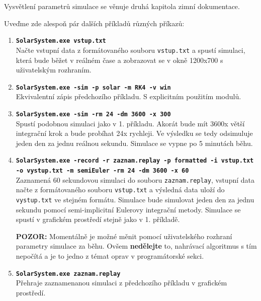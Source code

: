 Vysvětlení parametrů simulace se věnuje druhá kapitola zimní dokumentace.

Uveďme zde alespoň pár dalších příkladů různých příkazů:
\begin{enumerate}
	\item \texttt{\textbf{SolarSystem.exe vstup.txt}} \\
	Načte vstupní data z formátovaného souboru \texttt{vstup.txt} a spustí simulaci, která bude běžet v reálném čase a zobrazovat se v okně 1200x700 s uživatelským rozhraním.
	\item \texttt{\textbf{SolarSystem.exe -sim -p solar -m RK4 -v win}} \\
	 Ekvivalentní zápis předchozího příkladu. S explicitním použitím modulů.
	\item \texttt{\textbf{SolarSystem.exe -sim -rm 24 -dm 3600 -x 300}} \\
	Spustí podobnou simulaci jako v 1. příkladu. Akorát bude mít 3600x větší integrační krok a bude probíhat 24x rychleji. Ve výsledku se tedy odsimuluje jeden den za jednu reálnou sekundu. Simulace se vypne po 5 minutách běhu.
	\item \texttt{\textbf{SolarSystem.exe -record -r zaznam.replay -p formatted -i vstup.txt -o vystup.txt -m semiEuler -rm 24 -dm 3600 -x 60}}\\
	Zaznamená 60 sekundovou simulaci do souboru \texttt{zaznam.replay}, vstupní data načte z formátovaného souboru \texttt{vstup.txt} a výsledná data uloží do \texttt{vystup.txt} ve stejném formátu. Simulace bude simulovat jeden den za jednu sekundu pomocí semi-implicitní Eulerovy integrační metody. Simulace se spustí v grafickém prostředí stejně jako v 1. příkladě.
	
	\textbf{POZOR:} Momentálně je možné měnit pomocí uživatelského rozhraní parametry simulace za běhu. Ovšem \textbf{nedělejte} to, nahrávací algoritmus s tím nepočítá a je to jedno z témat oprav v programátorské sekci.
	\item  \texttt{\textbf{SolarSystem.exe zaznam.replay}}\\
	Přehraje zaznamenanou simulaci z předchozího příkladu v grafickém prostředí.
\end{enumerate}
\FloatBarrier
